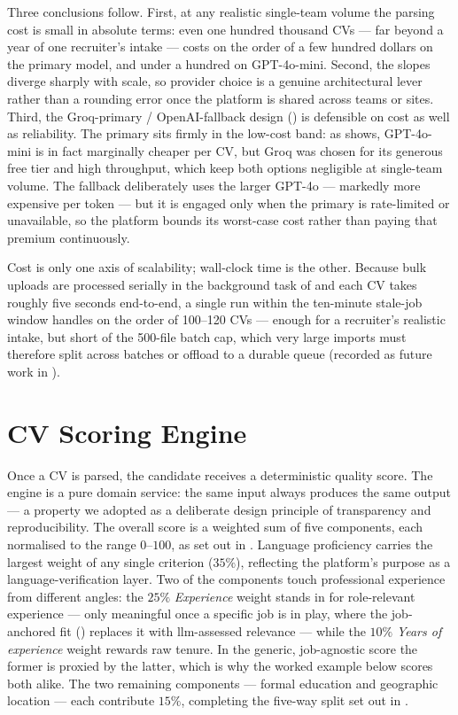 Three conclusions follow. First, at any realistic single-team volume the
parsing cost is small in absolute terms: even one hundred thousand CVs ---
far beyond a year of one recruiter's intake --- costs on the order of a few
hundred dollars on the primary model, and under a hundred on GPT-4o-mini.
Second, the slopes diverge sharply with scale, so provider choice is a
genuine architectural lever rather than a rounding error once the platform is
shared across teams or sites. Third, the Groq-primary / OpenAI-fallback design
() is defensible on cost as well as reliability. The
primary sits firmly in the low-cost band: as  shows,
GPT-4o-mini is in fact marginally cheaper per CV, but Groq was chosen for its
generous free tier and high throughput, which keep both options negligible at
single-team volume. The fallback deliberately uses the larger GPT-4o ---
markedly more expensive per token --- but it is engaged only when the primary
is rate-limited or unavailable, so the platform bounds its worst-case cost
rather than paying that premium continuously.

Cost is only one axis of scalability; wall-clock time is the other. Because
bulk uploads are processed serially in the background task of
 and each CV takes roughly five seconds end-to-end, a
single run within the ten-minute stale-job window handles on the order of
100--120 CVs --- enough for a recruiter's realistic intake, but short of the
500-file batch cap, which very large imports must therefore split across
batches or offload to a durable queue (recorded as future work in
).


\section{CV Scoring Engine}
\label{sec:impl-scoring}

Once a CV is parsed, the candidate receives a deterministic quality score.
The engine is a pure domain service: the same input always produces the same
output --- a property we adopted as a deliberate design principle of
transparency and reproducibility. The overall score is a weighted sum of five components, each
normalised to the range $0$--$100$, as set out in
. Language proficiency carries the largest weight of any
single criterion ($35\%$), reflecting the platform's purpose as a
language-verification layer. Two of the components touch professional
experience from different angles: the $25\%$ \emph{Experience} weight stands
in for role-relevant experience --- only meaningful once a specific job is in
play, where the job-anchored fit () replaces it with
\gls{llm}-assessed relevance --- while the $10\%$ \emph{Years of experience}
weight rewards raw tenure. In the generic, job-agnostic score the former is
proxied by the latter, which is why the worked example below scores both
alike. The two remaining components --- formal education and geographic
location --- each contribute $15\%$, completing the five-way split set out
in .

